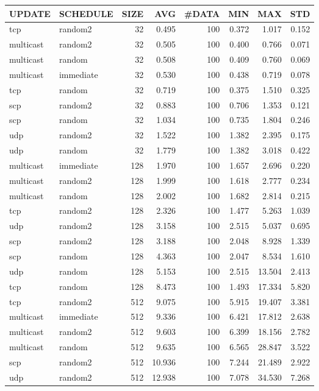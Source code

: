 \begin{tabular}{|l|l|r|r|r|r|r|r|}
\hline
UPDATE & SCHEDULE & SIZE & AVG & \#DATA & MIN & MAX & STD\\
\hline
tcp & random2 & 32 &  0.495 & 100 & 0.372 & 1.017 & 0.152\\
multicast & random2 & 32 &  0.505 & 100 & 0.400 & 0.766 & 0.071\\
multicast & random & 32 &  0.508 & 100 & 0.409 & 0.760 & 0.069\\
multicast & immediate & 32 &  0.530 & 100 & 0.438 & 0.719 & 0.078\\
tcp & random & 32 &  0.719 & 100 & 0.375 & 1.510 & 0.325\\
scp & random2 & 32 &  0.883 & 100 & 0.706 & 1.353 & 0.121\\
scp & random & 32 &  1.034 & 100 & 0.735 & 1.804 & 0.246\\
udp & random2 & 32 &  1.522 & 100 & 1.382 & 2.395 & 0.175\\
udp & random & 32 &  1.779 & 100 & 1.382 & 3.018 & 0.422\\
multicast & immediate & 128 &  1.970 & 100 & 1.657 & 2.696 & 0.220\\
multicast & random2 & 128 &  1.999 & 100 & 1.618 & 2.777 & 0.234\\
multicast & random & 128 &  2.002 & 100 & 1.682 & 2.814 & 0.215\\
tcp & random2 & 128 &  2.326 & 100 & 1.477 & 5.263 & 1.039\\
udp & random2 & 128 &  3.158 & 100 & 2.515 & 5.037 & 0.695\\
scp & random2 & 128 &  3.188 & 100 & 2.048 & 8.928 & 1.339\\
scp & random & 128 &  4.363 & 100 & 2.047 & 8.534 & 1.610\\
udp & random & 128 &  5.153 & 100 & 2.515 & 13.504 & 2.413\\
tcp & random & 128 &  8.473 & 100 & 1.493 & 17.334 & 5.820\\
tcp & random2 & 512 &  9.075 & 100 & 5.915 & 19.407 & 3.381\\
multicast & immediate & 512 &  9.336 & 100 & 6.421 & 17.812 & 2.638\\
multicast & random2 & 512 &  9.603 & 100 & 6.399 & 18.156 & 2.782\\
multicast & random & 512 &  9.635 & 100 & 6.565 & 28.847 & 3.522\\
scp & random2 & 512 &  10.936 & 100 & 7.244 & 21.489 & 2.922\\
udp & random2 & 512 &  12.938 & 100 & 7.078 & 34.530 & 7.268\\

\end{tabular}

